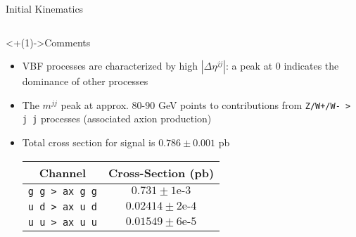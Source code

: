 \documentclass[]{beamer}
\begin{document}
\begin{frame}{Initial Kinematics}
    \begin{columns}
        \begin{column}{0.5\linewidth}
            \begin{block}<+(1)->{Comments}
                \begin{itemize}[<+(1)->]
                    \item VBF processes are characterized by high $|\Delta \eta^{jj}|$: a peak at $0$ indicates the dominance of other processes
                    \item The $m^{jj}$ peak at approx. $80$-$90$ GeV points to contributions from \texttt{Z/W+/W- > j j} processes (associated axion production)
                    \item Total cross section for signal is $0.786 \pm 0.001$ pb
                    
                    \smallskip
                    
                    \begin{tabular}{|c|c|}
                        \hline
                        Channel & Cross-Section (pb) \\
                        \hline
                        \hline
                        \texttt{g g > ax g g} & $0.731 \pm 1\text{e-}3$\\
                        \texttt{u d > ax u d} & $0.02414 \pm 2\text{e-}4$\\
                        \texttt{u u > ax u u} & $0.01549 \pm 6\text{e-}5$\\
                        \hline
                    \end{tabular}
                    
                    \smallskip
                    

\end{itemize}
\end{block}
\end{column}
\end{columns}
\end{frame}
\end{document}
